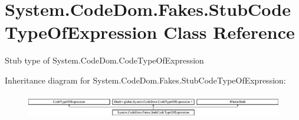 \hypertarget{class_system_1_1_code_dom_1_1_fakes_1_1_stub_code_type_of_expression}{\section{System.\-Code\-Dom.\-Fakes.\-Stub\-Code\-Type\-Of\-Expression Class Reference}
\label{class_system_1_1_code_dom_1_1_fakes_1_1_stub_code_type_of_expression}
}


Stub type of System.\-Code\-Dom.\-Code\-Type\-Of\-Expression 


Inheritance diagram for System.\-Code\-Dom.\-Fakes.\-Stub\-Code\-Type\-Of\-Expression\-:\begin{figure}[H]
\begin{center}
\leavevmode
\includegraphics[height=1.075889cm]{class_system_1_1_code_dom_1_1_fakes_1_1_stub_code_type_of_expression}
\end{center}
\end{figure}
